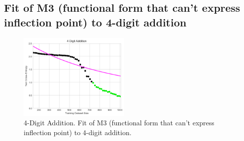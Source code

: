 \documentclass{article} %
\begin{document}

\iffalse

\subsection{Fit of M3 (functional form that can't express inflection point) to 4-digit addition}
\FloatBarrier
\label{section:M3_addition_failure}


\FloatBarrier

\begin{figure}[htbp]
    \centering
\includegraphics[width=0.48\textwidth]{figures/arithmetic/4_digit_addition__dataset_size__very_first_version__M3.png}

    \caption{
    4-Digit Addition. Fit of M3 (functional form that can't express inflection point) to 4-digit addition.
    }
    \label{fig:M3_addition_failure}
\end{figure}
\end{document}
